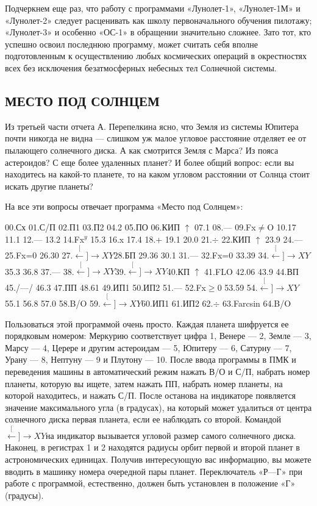 \documentclass[11pt,a4paper,oneside]{article}
\def\XY{$\stackrel[\leftarrow]{\rightarrow}{XY}$}
\begin{document}
Подчеркнем еще раз, что работу с программами «Лунолет-1», «Лунолет-1М» и «Лунолет-2» следует расценивать как школу первоначального обучения пилотажу; «Лунолет-3» и особенно «ОС-1» в обращении значительно сложнее. Зато тот, кто успешно освоил последнюю программу, может считать себя вполне подготовленным к осуществлению любых космических операций в окрестностях всех без исключения безатмосферных небесных тел Солнечной системы.

\subsection{МЕСТО ПОД СОЛНЦЕМ}
Из третьей части отчета А. Перепелкина ясно, что Земля из системы Юпитера почти никогда не видна — слишком уж малое угловое расстояние отделяет ее от пылающего солнечного диска. А как смотрится Земля с Марса? Из пояса астероидов? С еще более удаленных планет? И более общий вопрос: если вы находитесь на какой-то планете, то на каком угловом расстоянии от Солнца стоит искать другие планеты?

На все эти вопросы отвечает программа «Место под Солнцем»:

00.Сх 01.С/П 02.П1 03.П2 04.2 05.ПО 06.КИП $\uparrow$ 07.1 08.— 09.Fx$\neq$O 10.17 11.1 12.— 13.2 14.Fx$^{y}$ 15.3 16.x 17.4 18.+ 19.1 20.0 21.$\div$ 22.КИП $\uparrow$ 23.9 24.— 25.Fx=0 26.30 27.\XY 28.БП 29.36 30.1 31.— 32.Fx=0 33.39 34.\XY 35.3 36.8 37.— 38.\XY 39.\XY 40.КП $\uparrow$ 41.FLO 42.06 43.9 44.ВП 45./—/ 46.3 47.ПП 48.61
49.ИП1 50.ИП2 51.— 52.Fx$\geq$0 53.59
54.\XY 55.1 56.8 57.0 58.B/O 59.\XY 60.ИП1 61.ИП2 62.$\div$ 63.Farcsin 64.B/O

Пользоваться этой программой очень просто. Каждая планета шифруется ее порядковым номером: Меркурию соответствует цифра 1, Венере — 2, Земле — 3, Марсу — 4, Церере и другим астероидам — 5, Юпитеру — 6, Сатурну — 7, Урану — 8, Нептуну — 9 и Плутону — 10. После ввода программы в ПМК и переведения машины в автоматический режим нажать В/О и С/П, набрать номер планеты, которую вы ищете, затем нажать ПП, набрать номер планеты, на которой находитесь, и нажать С/П. После останова на индикаторе появляется значение максимального угла (в градусах), на который может удалиться от центра солнечного диска первая планета, если ее наблюдать со второй. Командой \XY на индикатор вызывается угловой размер самого солнечного диска. Наконец, в регистрах 1 и 2 находятся радиусы орбит первой и второй планет в астрономических единицах. Получив интересующую вас информацию, вы можете вводить в машинку номера очередной пары планет. Переключатель «Р—Г» при работе с программой, естественно, должен быть установлен в положение «Г» (градусы).
\end{document}
